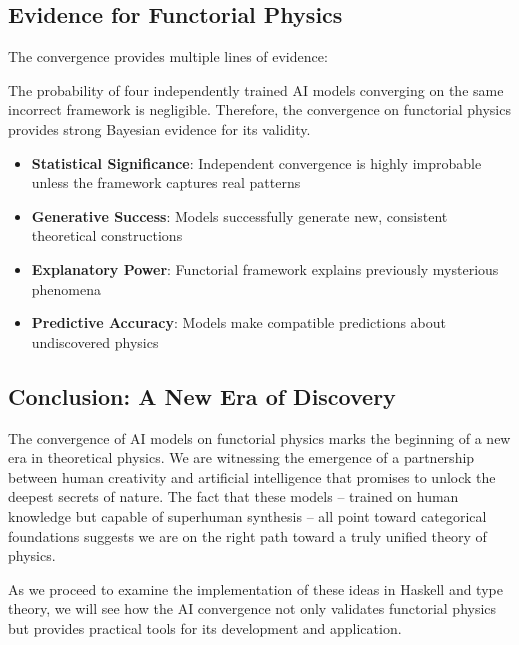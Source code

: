 \subsection{Evidence for Functorial Physics}

The convergence provides multiple lines of evidence:

\begin{theorem}
The probability of four independently trained AI models converging on the same incorrect framework is negligible. Therefore, the convergence on functorial physics provides strong Bayesian evidence for its validity.
\end{theorem}

\begin{itemize}[leftmargin=*]
\item \textbf{Statistical Significance}: Independent convergence is highly improbable unless the framework captures real patterns
\item \textbf{Generative Success}: Models successfully generate new, consistent theoretical constructions
\item \textbf{Explanatory Power}: Functorial framework explains previously mysterious phenomena
\item \textbf{Predictive Accuracy}: Models make compatible predictions about undiscovered physics
\end{itemize}

\subsection{Conclusion: A New Era of Discovery}

The convergence of AI models on functorial physics marks the beginning of a new era in theoretical physics. We are witnessing the emergence of a partnership between human creativity and artificial intelligence that promises to unlock the deepest secrets of nature. The fact that these models -- trained on human knowledge but capable of superhuman synthesis -- all point toward categorical foundations suggests we are on the right path toward a truly unified theory of physics.

As we proceed to examine the implementation of these ideas in Haskell and type theory, we will see how the AI convergence not only validates functorial physics but provides practical tools for its development and application.